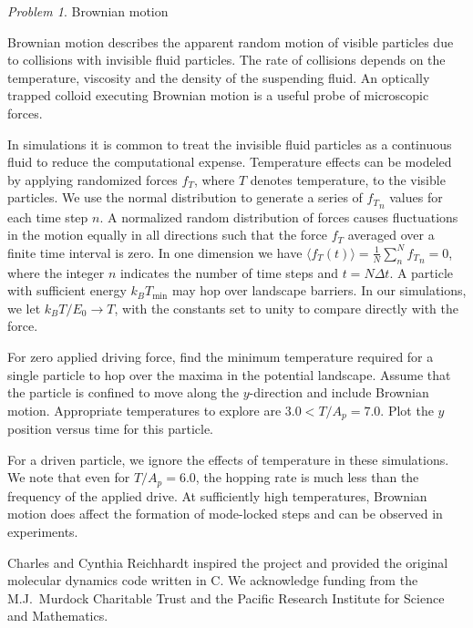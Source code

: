 \documentclass[preprint,showpacs,preprintnumbers,amsmath,amssymb,aps,prb]{revtex4-1}
\theoremstyle{remark}
\newtheorem{problem}{Problem}
\begin{document}
 \begin{problem}{Brownian motion}
  \label{ex:brownian}
  
\noindent Brownian motion describes the apparent random motion     of 
  visible particles  
  due to collisions with invisible fluid particles.
  The rate of collisions depends on the temperature, viscosity
  and the density of 
  the suspending fluid.\cite{Einstein1905}
  An optically trapped colloid executing Brownian motion
  is a useful probe of microscopic forces.\cite{Volpe2013}
  
  In   simulations
  it is common to treat the 
  invisible fluid particles as a continuous fluid
  to reduce the computational expense.
  Temperature effects
  can be modeled by applying randomized forces $f_T$,
  where $T$ denotes temperature, 
  to the visible particles.
  We use the normal distribution 
  to generate a series of ${f_T}_n$ values for
  each  time step $n$.\cite{numpy}
  A normalized random distribution of forces
  causes fluctuations in the
  motion 
  equally in all
  directions such that the force $f_T$
  averaged over a finite time interval
  is zero.  In one dimension we have 
$
    \langle f_T(t) \rangle = \frac{1}{N} \sum_n^N {f_T}_n = 0$,
  where the integer $n$ indicates the number of  
    time steps and 
  $t = N \Delta t$.
  A particle
  with sufficient energy $k_B T_{\min}$ may 
  hop over landscape
  barriers.
  In our simulations,
  we let   
  $k_B T/E_0 \rightarrow T$,
  with the constants set to unity
  to
  compare directly with the force. 
 
  For zero applied driving force,
  find 
  the minimum temperature required for a single particle
  to hop over the maxima in the potential landscape.
  Assume that the particle is confined to
  move along the $y$-direction and
  include Brownian motion.
  Appropriate temperatures to explore
  are $3.0 < T/A_p = 7.0$.
Plot the $y$ position versus time
  for this particle.
 

  For a driven particle,
  we ignore 
  the effects of temperature 
  in these simulations.  
  We note that even for $T/A_p = 6.0$, 
  the hopping rate
  is much less than the
  frequency of the applied drive.   
  At sufficiently high temperatures,
  Brownian motion does affect 
  the formation of mode-locked steps
  and can be observed in experiments.
\end{problem}

\begin{acknowledgments}
Charles and Cynthia Reichhardt
  inspired the project and
  provided the original molecular dynamics code
  written in  C.
  We acknowledge funding from the M.J.\ Murdock Charitable Trust
  and the Pacific Research Institute for Science and Mathematics.

\end{acknowledgments}
 
\end{document}
